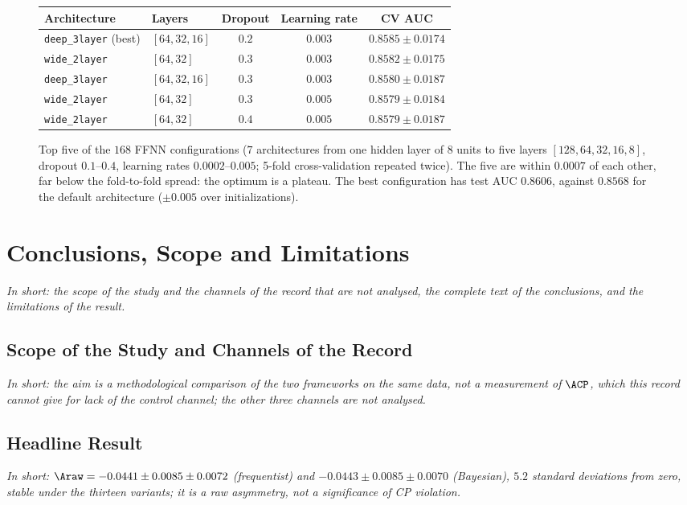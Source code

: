 \begin{figure}[!t]
\makeatletter{}\makeatother
\centering
\begin{tabular}{llccc}
\toprule
Architecture & Layers & Dropout & Learning rate & CV AUC \\
\midrule
\texttt{deep\_3layer} (best) & $[64,32,16]$ & $0.2$ & $0.003$ & $0.8585\pm0.0174$ \\
\texttt{wide\_2layer}        & $[64,32]$    & $0.3$ & $0.003$ & $0.8582\pm0.0175$ \\
\texttt{deep\_3layer}        & $[64,32,16]$ & $0.3$ & $0.003$ & $0.8580\pm0.0187$ \\
\texttt{wide\_2layer}        & $[64,32]$    & $0.3$ & $0.005$ & $0.8579\pm0.0184$ \\
\texttt{wide\_2layer}        & $[64,32]$    & $0.4$ & $0.005$ & $0.8579\pm0.0187$ \\
\bottomrule
\end{tabular}
\caption{Top five of the $168$ FFNN configurations ($7$ architectures from one hidden layer of 8 units to five layers $[128,64,32,16,8]$, dropout $0.1$--$0.4$, learning rates $0.0002$--$0.005$; 5-fold cross-validation repeated twice). The five are within $0.0007$ of each other, far below the fold-to-fold spread: the optimum is a plateau. The best configuration has test AUC $0.8606$, against $0.8568$ for the default architecture ($\pm0.005$ over initializations).}
\label{tab:ml_ffnn_search}
\end{figure}

\FloatBarrier

\section{Conclusions, Scope and Limitations}
\label{app:conclusions}
\emph{In short: the scope of the study and the channels of the record that are not analysed, the complete text of the conclusions, and the limitations of the result.}
\subsection{Scope of the Study and Channels of the Record}
\emph{In short: the aim is a methodological comparison of the two frameworks on the same data, not a measurement of $\ACP$, which this record cannot give for lack of the control channel; the other three channels are not analysed.}

\subsection{Headline Result}
\emph{In short: $\Araw=-0.0441\pm0.0085\pm0.0072$ (frequentist) and $-0.0443\pm0.0085\pm0.0070$ (Bayesian), $5.2$ standard deviations from zero, stable under the thirteen variants; it is a raw asymmetry, not a significance of CP violation.}

